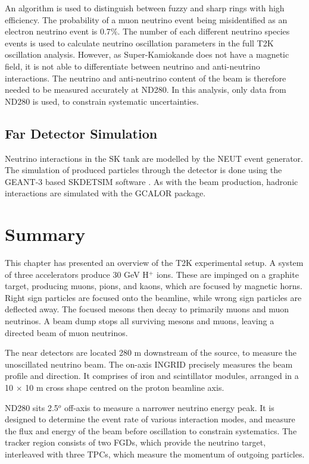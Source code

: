 An algorithm\cite{skrecoalg} is used to distinguish between fuzzy and sharp rings with high efficiency. The probability of a muon neutrino event being misidentified as an electron neutrino event is 0.7$\%$. The number of each different neutrino species events is used to calculate neutrino oscillation parameters in the full T2K oscillation analysis. However, as Super-Kamiokande does not have a magnetic field, it is not able to differentiate between neutrino and anti-neutrino interactions. The neutrino and anti-neutrino content of the beam is therefore needed to be measured accurately at ND280. In this analysis, only data from ND280 is used, to constrain systematic uncertainties.

\subsection{Far Detector Simulation}

Neutrino interactions in the SK tank are modelled by the \textsc{NEUT} event generator. The simulation of produced particles through the detector is done using the \textsc{GEANT-3}\cite{geant3} based \textsc{SKDETSIM} software \cite{skdetsim}. As with the beam production, hadronic interactions are simulated with the \textsc{GCALOR} package.

\section{Summary}

This chapter has presented an overview of the T2K experimental setup. A system of three accelerators produce 30 GeV H$^+$ ions. These are impinged on a graphite target, producing muons, pions, and kaons, which are focused by magnetic horns. Right sign particles are focused onto the beamline, while wrong sign particles are deflected away. The focused mesons then decay to primarily muons and muon neutrinos. A beam dump stops all surviving mesons and muons, leaving a directed beam of muon neutrinos.

The near detectors are located 280 m downstream of the source, to measure the unoscillated neutrino beam. The on-axis INGRID precisely measures the beam profile and direction. It comprises of iron and scintillator modules, arranged in a 10 $\times$ 10 m cross shape centred on the proton beamline axis.

ND280 sits 2.5$^o$ off-axis to measure a narrower neutrino energy peak. It is designed to determine the event rate of various interaction modes, and measure the flux and energy of the beam before oscillation to constrain systematics. The tracker region consists of two FGDs, which provide the neutrino target, interleaved with three TPCs, which measure the momentum of outgoing particles.

